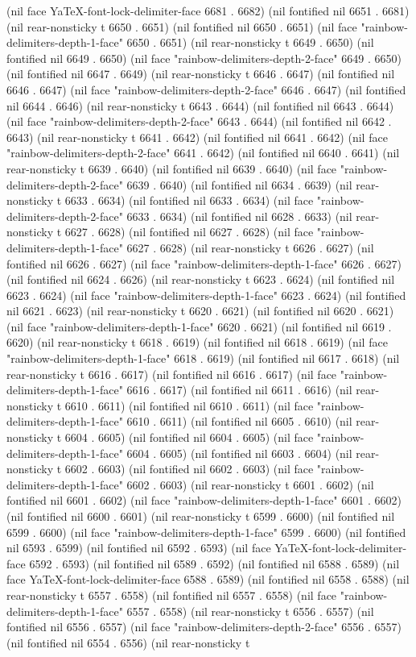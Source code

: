 (nil face YaTeX-font-lock-delimiter-face 6681 . 6682) (nil fontified nil 6651 . 6681) (nil rear-nonsticky t 6650 . 6651) (nil fontified nil 6650 . 6651) (nil face "rainbow-delimiters-depth-1-face" 6650 . 6651) (nil rear-nonsticky t 6649 . 6650) (nil fontified nil 6649 . 6650) (nil face "rainbow-delimiters-depth-2-face" 6649 . 6650) (nil fontified nil 6647 . 6649) (nil rear-nonsticky t 6646 . 6647) (nil fontified nil 6646 . 6647) (nil face "rainbow-delimiters-depth-2-face" 6646 . 6647) (nil fontified nil 6644 . 6646) (nil rear-nonsticky t 6643 . 6644) (nil fontified nil 6643 . 6644) (nil face "rainbow-delimiters-depth-2-face" 6643 . 6644) (nil fontified nil 6642 . 6643) (nil rear-nonsticky t 6641 . 6642) (nil fontified nil 6641 . 6642) (nil face "rainbow-delimiters-depth-2-face" 6641 . 6642) (nil fontified nil 6640 . 6641) (nil rear-nonsticky t 6639 . 6640) (nil fontified nil 6639 . 6640) (nil face "rainbow-delimiters-depth-2-face" 6639 . 6640) (nil fontified nil 6634 . 6639) (nil rear-nonsticky t 6633 . 6634) (nil fontified nil 6633 . 6634) (nil face "rainbow-delimiters-depth-2-face" 6633 . 6634) (nil fontified nil 6628 . 6633) (nil rear-nonsticky t 6627 . 6628) (nil fontified nil 6627 . 6628) (nil face "rainbow-delimiters-depth-1-face" 6627 . 6628) (nil rear-nonsticky t 6626 . 6627) (nil fontified nil 6626 . 6627) (nil face "rainbow-delimiters-depth-1-face" 6626 . 6627) (nil fontified nil 6624 . 6626) (nil rear-nonsticky t 6623 . 6624) (nil fontified nil 6623 . 6624) (nil face "rainbow-delimiters-depth-1-face" 6623 . 6624) (nil fontified nil 6621 . 6623) (nil rear-nonsticky t 6620 . 6621) (nil fontified nil 6620 . 6621) (nil face "rainbow-delimiters-depth-1-face" 6620 . 6621) (nil fontified nil 6619 . 6620) (nil rear-nonsticky t 6618 . 6619) (nil fontified nil 6618 . 6619) (nil face "rainbow-delimiters-depth-1-face" 6618 . 6619) (nil fontified nil 6617 . 6618) (nil rear-nonsticky t 6616 . 6617) (nil fontified nil 6616 . 6617) (nil face "rainbow-delimiters-depth-1-face" 6616 . 6617) (nil fontified nil 6611 . 6616) (nil rear-nonsticky t 6610 . 6611) (nil fontified nil 6610 . 6611) (nil face "rainbow-delimiters-depth-1-face" 6610 . 6611) (nil fontified nil 6605 . 6610) (nil rear-nonsticky t 6604 . 6605) (nil fontified nil 6604 . 6605) (nil face "rainbow-delimiters-depth-1-face" 6604 . 6605) (nil fontified nil 6603 . 6604) (nil rear-nonsticky t 6602 . 6603) (nil fontified nil 6602 . 6603) (nil face "rainbow-delimiters-depth-1-face" 6602 . 6603) (nil rear-nonsticky t 6601 . 6602) (nil fontified nil 6601 . 6602) (nil face "rainbow-delimiters-depth-1-face" 6601 . 6602) (nil fontified nil 6600 . 6601) (nil rear-nonsticky t 6599 . 6600) (nil fontified nil 6599 . 6600) (nil face "rainbow-delimiters-depth-1-face" 6599 . 6600) (nil fontified nil 6593 . 6599) (nil fontified nil 6592 . 6593) (nil face YaTeX-font-lock-delimiter-face 6592 . 6593) (nil fontified nil 6589 . 6592) (nil fontified nil 6588 . 6589) (nil face YaTeX-font-lock-delimiter-face 6588 . 6589) (nil fontified nil 6558 . 6588) (nil rear-nonsticky t 6557 . 6558) (nil fontified nil 6557 . 6558) (nil face "rainbow-delimiters-depth-1-face" 6557 . 6558) (nil rear-nonsticky t 6556 . 6557) (nil fontified nil 6556 . 6557) (nil face "rainbow-delimiters-depth-2-face" 6556 . 6557) (nil fontified nil 6554 . 6556) (nil rear-nonsticky t 